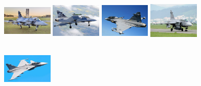 \begin{figure}[H]
\subcaptionbox{}
  {\includegraphics[height=2.4cm, width=2.4cm]{images/real-images/plane/1.png}}
\subcaptionbox{}%
  {\includegraphics[height=2.4cm, width=2.4cm]{images/real-images/plane/2.jpg}}
\subcaptionbox{}%
  {\includegraphics[height=2.4cm, width=2.4cm]{images/real-images/plane/3.jpg}}
\subcaptionbox{}
  {\includegraphics[height=2.4cm, width=2.4cm]{images/real-images/plane/4.jpg}}
\subcaptionbox{}%
  {\includegraphics[height=2.4cm, width=2.4cm]{images/real-images/plane/5.jpg}}


\end{figure}
